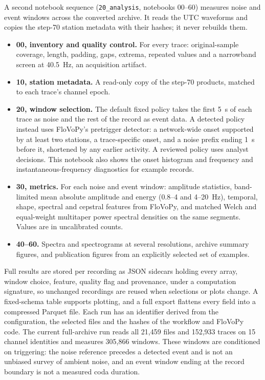 \documentclass[linenum]{SSA-SRL}
\newcommand{\file}[1]{\texttt{#1}}
\begin{document}
A second notebook sequence (\file{20\_analysis}, notebooks 00--60) measures noise and event windows across the converted archive. It reads the UTC waveforms and copies the step-70 station metadata with their hashes; it never rebuilds them.
\begin{itemize}
\item \textbf{00, inventory and quality control.} For every trace: original-sample coverage, length, padding, gaps, extrema, repeated values and a narrowband screen at 40.5~Hz, an acquisition artifact.
\item \textbf{10, station metadata.} A read-only copy of the step-70 products, matched to each trace's channel epoch.
\item \textbf{20, window selection.} The default fixed policy takes the first 5~s of each trace as noise and the rest of the record as event data. A detected policy instead uses FloVoPy's pretrigger detector: a network-wide onset supported by at least two stations, a trace-specific onset, and a noise prefix ending 1~s before it, shortened by any earlier activity. A reviewed policy uses analyst decisions. This notebook also shows the onset histogram and frequency and instantaneous-frequency diagnostics for example records.
\item \textbf{30, metrics.} For each noise and event window: amplitude statistics, band-limited mean absolute amplitude and energy (0.8--4 and 4--20~Hz), temporal, shape, spectral and cepstral features from FloVoPy, and matched Welch \citep{Welch_1967} and equal-weight multitaper \citep{Thomson_1982} power spectral densities on the same segments. Values are in uncalibrated counts.
\item \textbf{40--60.} Spectra and spectrograms at several resolutions, archive summary figures, and publication figures from an explicitly selected set of examples.
\end{itemize}
Full results are stored per recording as JSON sidecars holding every array, window choice, feature, quality flag and provenance, under a computation signature, so unchanged recordings are reused when selections or plots change. A fixed-schema table supports plotting, and a full export flattens every field into a compressed Parquet file. Each run has an identifier derived from the configuration, the selected files and the hashes of the workflow and FloVoPy code. The current full-archive run reads all 21,459 files and 152,933 traces on 15 channel identities and measures 305,866 windows. These windows are conditioned on triggering: the noise reference precedes a detected event and is not an unbiased survey of ambient noise, and an event window ending at the record boundary is not a measured coda duration.
\end{document}
